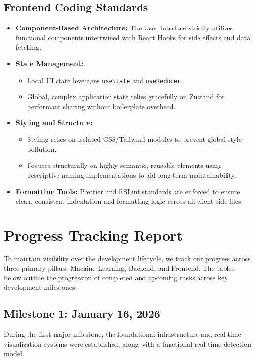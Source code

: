 \subsection{Frontend Coding Standards}
\begin{itemize}[leftmargin=40pt]
    \item \textbf{Component-Based Architecture:} The User Interface strictly utilizes functional components intertwined with React Hooks for side effects and data fetching.
    \item \textbf{State Management:} 
    \begin{itemize}
        \item Local UI state leverages \texttt{useState} and \texttt{useReducer}.
        \item Global, complex application state relies gracefully on Zustand for performant sharing without boilerplate overhead.
    \end{itemize}
    \item \textbf{Styling and Structure:}
    \begin{itemize}
        \item Styling relies on isolated CSS/Tailwind modules to prevent global style pollution.
        \item Focuses structurally on highly semantic, reusable elements using descriptive naming implementations to aid long-term maintainability.
    \end{itemize}
    \item \textbf{Formatting Tools:} Prettier and ESLint standards are enforced to ensure clean, consistent indentation and formatting logic across all client-side files.
\end{itemize}

\section{Progress Tracking Report}
\label{section:progress-tracking-report}

To maintain visibility over the development lifecycle, we track our progress across three primary pillars: Machine Learning, Backend, and Frontend. The tables below outline the progression of completed and upcoming tasks across key development milestones.

\subsection{Milestone 1: January 16, 2026}
During the first major milestone, the foundational infrastructure and real-time visualization systems were established, along with a functional real-time detection model. 

